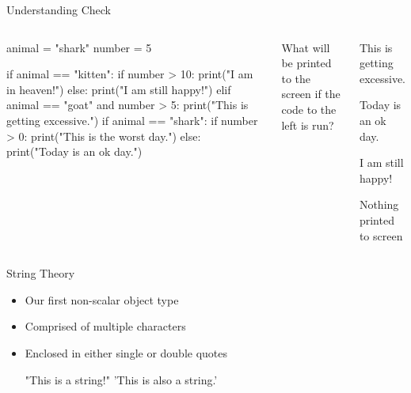 \documentclass[pdf, aspectratio=169, 12pt]{beamer}
\begin{document}
\begin{frame}[fragile]{Understanding Check}
	\begin{columns}
		\vspace{3mm}
		\begin{pythoncode}[basicstyle=\footnotesize\ttfamily]
			animal = "shark"
			number = 5

			if animal == "kitten":
				if number > 10:
					print("I am in heaven!")
				else:
					print("I am still happy!")
			elif animal == "goat" and number > 5:
				print("This is getting excessive.")
			if animal == "shark":
				if number > 0:
					print("This is the worst day.")
			else:
				print("Today is an ok day.")
		\end{pythoncode}
		
		What will be printed to the screen if the code to the left is run?
		\begin{poll}
		\item This is getting excessive.
		\item Today is an ok day.
		\item I am still happy!
		\item Nothing printed to screen
		\end{poll}
	\end{columns}
\end{frame}

\begin{frame}[fragile]{String Theory}
	\begin{itemize}
		\item Our first non-scalar object type
		\item Comprised of multiple characters
		\item Enclosed in either single or double quotes
			\begin{pythoncode}
				"This is a string!"
				'This is also a string.'
			\end{pythoncode}
	\end{itemize}
\end{frame}
\end{document}
